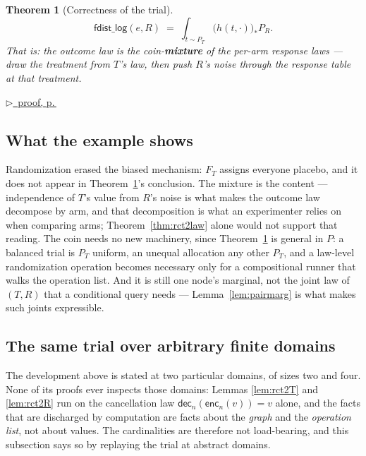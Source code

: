 \documentclass[11pt,a4paper]{article}
\theoremstyle{definition}
\theoremstyle{plain}
\newtheorem{theorem}[definition]{Theorem}
\theoremstyle{remark}
\newcommand{\enc}{\mathsf{enc}}
\newcommand{\dect}{\mathsf{dec}}
\newcommand{\push}[1]{{#1}_{*}}        %
\newcommand{\pfref}[1]{%
  \par\smallskip\noindent
  \hyperref[pf:#1]{\small$\triangleright$\ proof, p.\,\pageref{pf:#1}}\par\smallskip}
\begin{document}
\begin{theorem}[Correctness of the trial]
\label{thm:rct2}
\[
  \mathsf{fdist\_log}(e, R)
  \;=\;
  \int_{t \sim P_T} \push{\bigl(h(t,\cdot)\bigr)} P_R .
\]
That is: the outcome law is the coin-\textbf{mixture} of the per-arm
response laws --- draw the treatment from $T$'s law, then push $R$'s noise
through the response table at that treatment.
\end{theorem}

\pfref{thm:rct2}

\subsection{What the example shows}

Randomization erased the biased mechanism: $F_T$ assigns everyone placebo,
and it does not appear in Theorem~\ref{thm:rct2}'s conclusion. The mixture
is the content --- independence of $T$'s value from $R$'s noise is what
makes the outcome law decompose by arm, and that decomposition is what an
experimenter relies on when comparing arms; Theorem~\ref{thm:rct2law}
alone would not support that reading. The coin needs no new machinery,
since Theorem~\ref{thm:rct2} is general in $P$: a balanced trial is $P_T$
uniform, an unequal allocation any other $P_T$, and a law-level
randomization operation becomes necessary only for a compositional runner
that walks the operation list. And it is still one node's marginal, not
the joint law of $(T,R)$ that a conditional query needs ---
Lemma~\ref{lem:pairmarg} is what makes such joints expressible.

\subsection{The same trial over arbitrary finite domains}
\label{sec:rct2gen}

The development above is stated at two particular domains, of sizes two and
four. None of its proofs ever inspects those domains: Lemmas
\ref{lem:rct2T} and \ref{lem:rct2R} run on the cancellation law
$\dect_n(\enc_n(v)) = v$ alone, and the facts that are discharged by
computation are facts about the \emph{graph} and the \emph{operation list},
not about values. The cardinalities are therefore not load-bearing, and
this subsection says so by replaying the trial at abstract domains.
\end{document}

